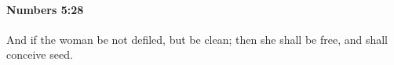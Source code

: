 
		\paragraph{Numbers 5:28} %
			\label{NUMBERS-5-28}

			And if the woman be not defiled, but be clean; then she shall be free, and shall conceive seed.


